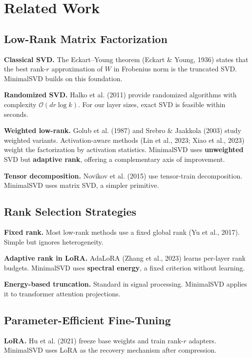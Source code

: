 
\section{Related Work}

\subsection{Low-Rank Matrix Factorization}

\textbf{Classical SVD.} The Eckart--Young theorem (Eckart \& Young, 1936) states 
that the best rank-$r$ approximation of $W$ in Frobenius norm is the truncated 
SVD. MinimalSVD builds on this foundation.

\textbf{Randomized SVD.} Halko et al. (2011) provide randomized algorithms with 
complexity $\mathcal{O}(dr \log k)$. For our layer sizes, exact SVD is 
feasible within seconds.

\textbf{Weighted low-rank.} Golub et al. (1987) and Srebro \& Jaakkola (2003) study 
weighted variants. Activation-aware methods (Lin et al., 2023; Xiao et al., 
2023) weight the factorization by activation statistics. MinimalSVD uses 
\textbf{unweighted} SVD but \textbf{adaptive rank}, offering a complementary axis of 
improvement.

\textbf{Tensor decomposition.} Novikov et al. (2015) use tensor-train 
decomposition. MinimalSVD uses matrix SVD, a simpler primitive.

\subsection{Rank Selection Strategies}

\textbf{Fixed rank.} Most low-rank methods use a fixed global rank (Yu et al., 
2017). Simple but ignores heterogeneity.

\textbf{Adaptive rank in LoRA.} AdaLoRA (Zhang et al., 2023) learns per-layer 
rank budgets. MinimalSVD uses \textbf{spectral energy}, a fixed criterion 
without learning.

\textbf{Energy-based truncation.} Standard in signal processing. MinimalSVD 
applies it to transformer attention projections.

\subsection{Parameter-Efficient Fine-Tuning}

\textbf{LoRA.} Hu et al. (2021) freeze base weights and train rank-$r$ adapters. 
MinimalSVD uses LoRA as the recovery mechanism after compression.

